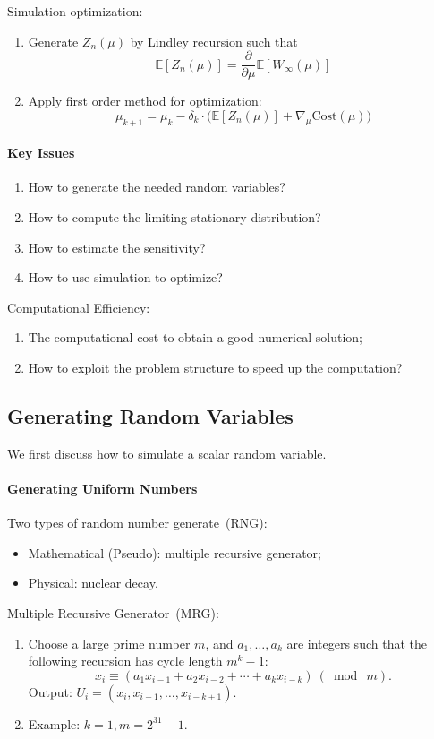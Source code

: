 Simulation optimization:
\begin{enumerate}
\item
Generate $Z_{n}(\mu)$ by Lindley recursion such that
\[
\mathbb{E}[Z_n(\mu)] = 
\frac{\partial }{\partial \mu}
\mathbb{E}[W_\infty(\mu)]
\]
\item
Apply first order method for optimization:
\[
\mu_{k+1} = \mu_k - \delta_k\cdot\bigg(
\mathbb{E}[Z_n(\mu)]+\nabla_{\mu}\text{Cost}(\mu)
\bigg)
\]
\end{enumerate}
\paragraph{Key Issues}
\begin{enumerate}
\item
How to generate the needed random variables?
\item
How to compute the limiting stationary distribution?
\item
How to estimate the sensitivity?
\item
How to use simulation to optimize?
\end{enumerate}

Computational Efficiency:
\begin{enumerate}
\item
The computational cost to obtain a good numerical solution;
\item
How to exploit the problem structure to speed up the computation?
\end{enumerate}

\subsection{Generating Random Variables}

We first discuss how to simulate a scalar random variable.
\paragraph{Generating Uniform Numbers}
Two types of random number generate~(RNG):
\begin{itemize}
\item
Mathematical (Pseudo): multiple recursive generator;
\item
Physical: nuclear decay.
\end{itemize}
Multiple Recursive Generator~(MRG):
\begin{enumerate}
\item
Choose a large prime number $m$,
and $a_1,\ldots,a_k$ are integers such that the following recursion has cycle length $m^k-1$:
\[
x_i\equiv(a_1x_{i-1}+a_2x_{i-2}+\cdots+a_kx_{i-k})~(\bmod~m).
\]
Output: $U_i = (x_i,x_{i-1},\ldots,x_{i-k+1})$.
\item
Example: $k=1,m = 2^{31}-1$.
\end{enumerate}

